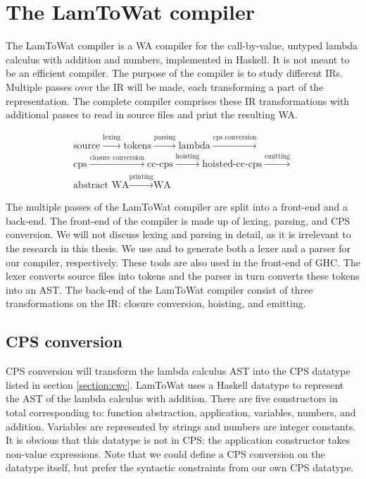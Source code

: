 
\chapter{\label{chap:compiler}The LamToWat compiler}
The LamToWat compiler is a \ac{WA} compiler for the call-by-value, untyped lambda calculus with addition and numbers, implemented in Haskell. It is not meant to be an efficient compiler. The purpose of the compiler is to study different \acp{IR}. Multiple passes over the \ac{IR} will be made, each transforming a part of the representation. The complete compiler comprises these \ac{IR} transformations with additional passes to read in source files and print the resulting \ac{WA}.

\begin{gather*}
  \mbox{source} \xrightarrow{\mbox{lexing}} \mbox{tokens} \xrightarrow{\mbox{parsing}} \mbox{lambda} \xrightarrow{\mbox{cps conversion}} \\
  \mbox{cps} \xrightarrow{\mbox{closure conversion}} \mbox{cc-cps} \xrightarrow{\mbox{hoisting}} \mbox{hoisted-cc-cps} \xrightarrow{\mbox{emitting}} \\
  \mbox{abstract WA} \xrightarrow{\mbox{printing}} \mbox{WA}
\end{gather*}


The multiple passes of the LamToWat compiler are split into a front-end and a back-end. The front-end of the compiler is made up of lexing, parsing, and \ac{CPS} conversion. We will not discuss lexing and parsing in detail, as it is irrelevant to the research in this thesis. We use \autocite{haskellalex} and \autocite{haskellhappy} to generate both a lexer and a parser for our compiler, respectively. These tools are also used in the front-end of \ac{GHC}. The lexer converts source files into tokens and the parser in turn converts these tokens into an \ac{AST}. The back-end of the LamToWat compiler consist of three transformations on the \ac{IR}: closure conversion, hoisting, and emitting.

\section{\label{section:cpsconvert}CPS conversion}
\ac{CPS} conversion will transform the lambda calculus \ac{AST} into the \ac{CPS} datatype listed in section \ref{section:cwc}. LamToWat uses a Haskell datatype to represent the \ac{AST} of the lambda calculus with addition. There are five constructors in total corresponding to: function abstraction, application, variables, numbers, and addition. Variables are represented by strings and numbers are integer constants. It is obvious that this datatype is not in \ac{CPS}: the application constructor takes non-value expressions. Note that we could define a \ac{CPS} conversion on the datatype itself, but prefer the syntactic constraints from our own \ac{CPS} datatype.

